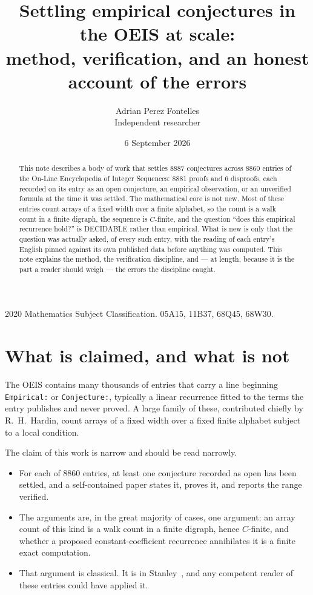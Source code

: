 \documentclass[11pt,a4paper]{article}
\title{Settling empirical conjectures in the OEIS at scale:\\
\large method, verification, and an honest account of the errors}
\author{Adrian Perez Fontelles\\ \small Independent researcher}
\date{6 September 2026}
\theoremstyle{plain}
\theoremstyle{definition}
\begin{document}
\maketitle

\begin{abstract}
This note describes a body of work that settles 8887 conjectures across 8860 entries of the
On-Line Encyclopedia of Integer Sequences: 8881 proofs and 6 disproofs, each recorded on its
entry as an open conjecture, an empirical observation, or an unverified formula at the time it
was settled. The mathematical core is not new. Most of these entries count arrays of a fixed
width over a finite alphabet, so the count is a walk count in a finite digraph, the sequence is
$C$-finite, and the question ``does this empirical recurrence hold?'' is DECIDABLE rather than
empirical. What is new is only that the question was actually asked, of every such entry, with
the reading of each entry's English pinned against its own published data before anything was
computed. This note explains the method, the verification discipline, and --- at length,
because it is the part a reader should weigh --- the errors the discipline caught.
\end{abstract}

\noindent\small 2020 Mathematics Subject Classification. 05A15, 11B37, 68Q45, 68W30.\normalsize

\section{What is claimed, and what is not}

The OEIS contains many thousands of entries that carry a line beginning \texttt{Empirical:} or
\texttt{Conjecture:}, typically a linear recurrence fitted to the terms the entry publishes and
never proved. A large family of these, contributed chiefly by R.~H.~Hardin, count arrays of a
fixed width over a fixed finite alphabet subject to a local condition.

The claim of this work is narrow and should be read narrowly.

\begin{itemize}
\item For each of 8860 entries, at least one conjecture recorded as open has been settled, and
a self-contained paper states it, proves it, and reports the range verified.
\item The arguments are, in the great majority of cases, one argument: an array count of this
kind is a walk count in a finite digraph, hence $C$-finite, and whether a proposed
constant-coefficient recurrence annihilates it is a finite exact computation.
\item That argument is classical. It is in Stanley~\cite{stanley}, and any competent reader of
these entries could have applied it.
\end{itemize}
\end{document}
